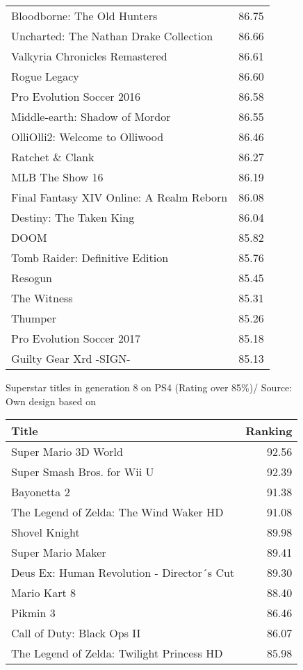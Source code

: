 \documentclass
[
    a4paper,
    11pt
]
{article}
\begin{document}
\begin{appendix}
\begin{figure}
\begin{tabular}{  p{8cm} r }
    Bloodborne: The Old Hunters&86.75\\
    Uncharted: The Nathan Drake Collection&86.66\\
    Valkyria Chronicles Remastered&86.61\\
    Rogue Legacy&86.60\\
    Pro Evolution Soccer 2016&86.58\\
    Middle-earth: Shadow of Mordor&86.55\\
    OlliOlli2: Welcome to Olliwood&86.46\\
    Ratchet \& Clank&86.27\\
    MLB The Show 16&86.19\\
    Final Fantasy XIV Online: A Realm Reborn&86.08\\
    Destiny: The Taken King&86.04\\
    DOOM&85.82\\
    Tomb Raider: Definitive Edition&85.76\\
    Resogun&85.45\\
    The Witness&85.31\\
    Thumper&85.26\\
    Pro Evolution Soccer 2017&85.18\\
    Guilty Gear Xrd -SIGN-&85.13\\ \hline
    \end{tabular}
	\caption{Superstar titles in generation 8 on PS4 (Rating over 85\%)/ Source: Own design based on  \cite{Gamerankings2016}}
		\label{tab:ps4superstars}
\end{figure}
%
\begin{figure} \centering
 \small
\begin{tabular}{ p{8cm} r}
  \hline
    Title&Ranking \\ \hline \hline
    Super Mario 3D World&92.56\\
    Super Smash Bros. for Wii U&92.39\\
    Bayonetta 2&91.38\\
    The Legend of Zelda: The Wind Waker HD& 91.08\\
    Shovel Knight&89.98\\
    Super Mario Maker&89.41\\
    Deus Ex: Human Revolution - Director´s Cut&89.30\\
    Mario Kart 8&88.40\\
    Pikmin 3&86.46\\
    Call of Duty: Black Ops II&86.07\\
    The Legend of Zelda: Twilight Princess HD&85.98\\\hline

\end{tabular}
\end{figure}
\end{appendix}
\end{document}
